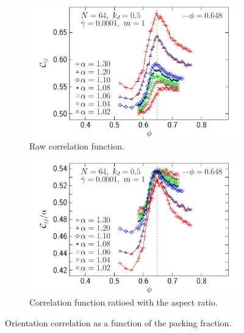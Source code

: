 \documentclass[class=report, float=false, crop=false]{standalone}
\begin{document}

\begin{figure}[h!]
\centering
    \begin{subfigure}[t]{0.49\textwidth}
        \centering
        \includegraphics[width=\textwidth]{figures/figs/orij_phi_prolate_0064_KDk500_Ml100_GDh100}
        \caption{Raw correlation function.}
        \label{orij_phi_prolate_0064_KDk500_Ml100_GDh100}
    \end{subfigure}
    \hfill
    \begin{subfigure}[t]{0.49\textwidth}
        \centering
        \includegraphics[width=\textwidth]{figures/figs/orijal_phi_prolate_0064_KDk500_Ml100_GDh100}
        \caption{Correlation function ratioed with the aspect ratio.}
        \label{orijal_phi_prolate_0064_KDk500_Ml100_GDh100}
    \end{subfigure}
    \caption{Orientation correlation as a function of the packing fraction.}
    \label{orij_phi_0064}
\end{figure}
\end{document}
